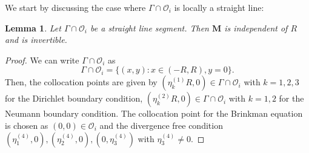 \documentclass[preprint,11pt]{elsarticle}
\newtheorem{lemma}{Lemma}
\theoremstyle{remark}
\newcommand{\mc}[1]{\mathcal{#1}}
\newcommand{\bm}[1]{\boldsymbol{#1}}
\begin{document}
We start by discussing the case where $\Gamma\cap \mc O_i$ is locally a straight line:
\begin{lemma}
    Let $\Gamma\cap \mc O_i$ be a straight line segment. Then $\bm M$ is independent of $R$ and is invertible.
\end{lemma}
\begin{proof}
We can write $\Gamma\cap \mc O_i$ as
\begin{equation}
    \Gamma\cap \mc O_i = \{(x,y):x\in (-R, R), y = 0\}.
\end{equation}
Then, the collocation points are given by $(\eta_k^{(1)} R, 0)\in \Gamma\cap \mc O_i$ with $k = 1,2,3$ for the Dirichlet boundary condition, $(\eta_k^{(2)} R, 0)\in \Gamma\cap \mc O_i$ with $k = 1,2$ for the Neumann boundary condition. The collocation point for the Brinkman equation is chosen as $(0, 0)\in \mc O_i$ and the divergence free condition $(\eta_1^{(4)}, 0), (\eta_2^{(4)}, 0), (0, \eta_3^{(4)})$ with $\eta_3^{(4)}\neq 0$.



\end{proof}
\end{document}
